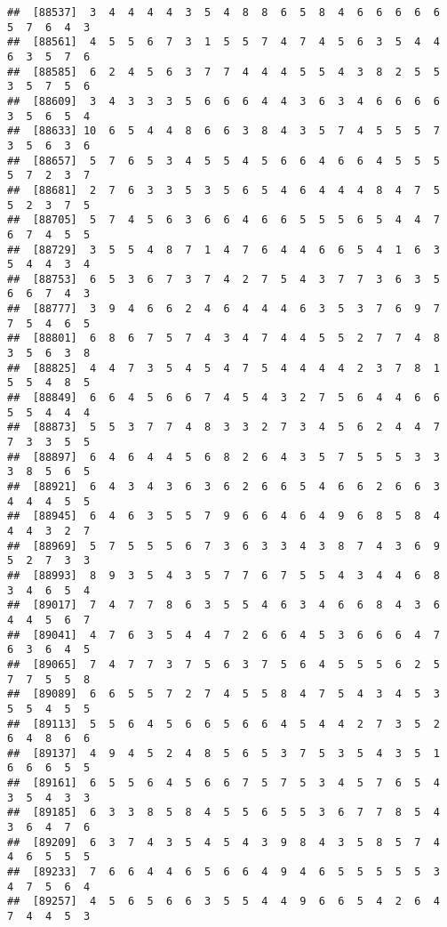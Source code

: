 \documentclass[
]{book}
\begin{document}
\begin{verbatim}
##  [88537]  3  4  4  4  4  3  5  4  8  8  6  5  8  4  6  6  6  6  6  5  7  6  4  3
##  [88561]  4  5  5  6  7  3  1  5  5  7  4  7  4  5  6  3  5  4  4  6  3  5  7  6
##  [88585]  6  2  4  5  6  3  7  7  4  4  4  5  5  4  3  8  2  5  5  3  5  7  5  6
##  [88609]  3  4  3  3  3  5  6  6  6  4  4  3  6  3  4  6  6  6  6  3  5  6  5  4
##  [88633] 10  6  5  4  4  8  6  6  3  8  4  3  5  7  4  5  5  5  7  3  5  6  3  6
##  [88657]  5  7  6  5  3  4  5  5  4  5  6  6  4  6  6  4  5  5  5  5  7  2  3  7
##  [88681]  2  7  6  3  3  5  3  5  6  5  4  6  4  4  4  8  4  7  5  5  2  3  7  5
##  [88705]  5  7  4  5  6  3  6  6  4  6  6  5  5  5  6  5  4  4  7  6  7  4  5  5
##  [88729]  3  5  5  4  8  7  1  4  7  6  4  4  6  6  5  4  1  6  3  5  4  4  3  4
##  [88753]  6  5  3  6  7  3  7  4  2  7  5  4  3  7  7  3  6  3  5  6  6  7  4  3
##  [88777]  3  9  4  6  6  2  4  6  4  4  4  6  3  5  3  7  6  9  7  7  5  4  6  5
##  [88801]  6  8  6  7  5  7  4  3  4  7  4  4  5  5  2  7  7  4  8  3  5  6  3  8
##  [88825]  4  4  7  3  5  4  5  4  7  5  4  4  4  4  2  3  7  8  1  5  5  4  8  5
##  [88849]  6  6  4  5  6  6  7  4  5  4  3  2  7  5  6  4  4  6  6  5  5  4  4  4
##  [88873]  5  5  3  7  7  4  8  3  3  2  7  3  4  5  6  2  4  4  7  7  3  3  5  5
##  [88897]  6  4  6  4  4  5  6  8  2  6  4  3  5  7  5  5  5  3  3  3  8  5  6  5
##  [88921]  6  4  3  4  3  6  3  6  2  6  6  5  4  6  6  2  6  6  3  4  4  4  5  5
##  [88945]  6  4  6  3  5  5  7  9  6  6  4  6  4  9  6  8  5  8  4  4  4  3  2  7
##  [88969]  5  7  5  5  5  6  7  3  6  3  3  4  3  8  7  4  3  6  9  5  2  7  3  3
##  [88993]  8  9  3  5  4  3  5  7  7  6  7  5  5  4  3  4  4  6  8  3  4  6  5  4
##  [89017]  7  4  7  7  8  6  3  5  5  4  6  3  4  6  6  8  4  3  6  4  4  5  6  7
##  [89041]  4  7  6  3  5  4  4  7  2  6  6  4  5  3  6  6  6  4  7  6  3  6  4  5
##  [89065]  7  4  7  7  3  7  5  6  3  7  5  6  4  5  5  5  6  2  5  7  7  5  5  8
##  [89089]  6  6  5  5  7  2  7  4  5  5  8  4  7  5  4  3  4  5  3  5  5  4  5  5
##  [89113]  5  5  6  4  5  6  6  5  6  6  4  5  4  4  2  7  3  5  2  6  4  8  6  6
##  [89137]  4  9  4  5  2  4  8  5  6  5  3  7  5  3  5  4  3  5  1  6  6  6  5  5
##  [89161]  6  5  5  6  4  5  6  6  7  5  7  5  3  4  5  7  6  5  4  3  5  4  3  3
##  [89185]  6  3  3  8  5  8  4  5  5  6  5  5  3  6  7  7  8  5  4  3  6  4  7  6
##  [89209]  6  3  7  4  3  5  4  5  4  3  9  8  4  3  5  8  5  7  4  4  6  5  5  5
##  [89233]  7  6  6  4  4  6  5  6  6  4  9  4  6  5  5  5  5  5  3  4  7  5  6  4
##  [89257]  4  5  6  5  6  6  3  5  5  4  4  9  6  6  5  4  2  6  4  7  4  4  5  3

\end{verbatim}
\end{document}

